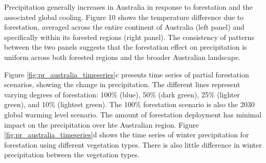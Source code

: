 \documentclass[]{article}
\begin{document}
%

Precipitation generally increases in Australia in response to forestation and the associated global cooling.
Figure 10 shows the temperature difference due to forestation, averaged across the entire continent of Australia (left panel) and specifically within its forested regions (right panel).
The consistency of patterns between the two panels suggests that the forestation effect on precipitation is uniform across both forested regions and the broader Australian landscape.


Figure \ref{fig:pr_australia_timeseries}c presents time series of partial forestation scenarios, showing the change in precipitation. The different lines represent varying degrees of forestation: 100\% (blue), 50\% (dark green), 25\% (lighter green), and 10\% (lightest green).
The 100\% forestation scenario is also the 2030 global warming level scenario.
The amount of forestation deployment has minimal impact on the precipitation over hte Australian region.
Figure \ref{fig:pr_australia_timeseries}d shows the time series of winter precipitation for forestation using different vegetation types.
There is also little difference in winter precipitation between the vegetation types.
\end{document}
